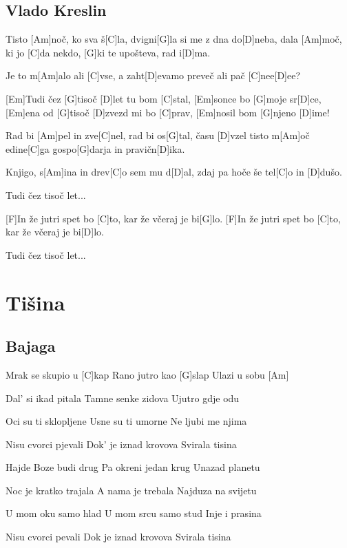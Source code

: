 \documentclass[a4paper,12pt]{article}
\begin{document}
\begin{multicols}{2}
\subsection*{Vlado Kreslin}
\begin{guitar}

Tisto [Am]noč, ko sva š[C]la, 
dvigni[G]la si me z dna do[D]neba, 
dala [Am]moč, ki jo [C]da 
nekdo, [G]ki te upošteva, rad i[D]ma. 


Je to m[Am]alo ali [C]vse,
a zaht[D]evamo preveč ali pač [C]nee[D]ee?


[Em]Tudi čez [G]tisoč [D]let tu bom [C]stal, 
[Em]sonce bo [G]moje sr[D]ce, 
[Em]ena od [G]tisoč [D]zvezd mi bo [C]prav, 
[Em]nosil bom [G]njeno [D]ime! 


Rad bi [Am]pel in zve[C]nel, 
rad bi os[G]tal, času [D]vzel 
tisto m[Am]oč edine[C]ga 
gospo[G]darja in pravičn[D]ika. 


Knjigo, s[Am]ina in drev[C]o sem mu d[D]al, 
zdaj pa hoče še tel[C]o in [D]dušo. 


Tudi čez tisoč let...


[F]In že jutri spet bo [C]to, 
kar že včeraj je bi[G]lo. 
[F]In že jutri spet bo [C]to,
kar že včeraj je bi[D]lo. 


Tudi čez tisoč let...

\end{guitar}
\section{Tišina}
\subsection*{Bajaga}
\begin{guitar}
[Am]Mrak se skupio u [C]kap
Rano jutro kao [G]slap
Ulazi u sobu  [Am]


Dal' si ikad pitala
Tamne senke zidova
Ujutro gdje odu


Oci su ti sklopljene
Usne su ti umorne
Ne ljubi me njima


Nisu cvorci pjevali
Dok' je iznad krovova
Svirala tisina


Hajde Boze budi drug
Pa okreni jedan krug
Unazad planetu


Noc je kratko trajala
A nama je trebala
Najduza na svijetu


U mom oku samo hlad
U mom srcu samo stud
Inje i prasina


Nisu cvorci pevali
Dok je iznad krovova
Svirala tisina



\end{guitar}
\end{multicols}
\end{document}
